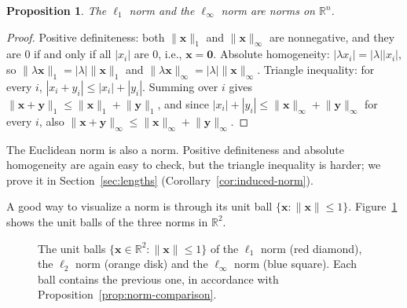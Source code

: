 \documentclass[11pt]{article}
\newcommand{\norm}[1]{\lVert #1 \rVert}
\theoremstyle{definition}
\theoremstyle{plain}
\newtheorem{proposition}[definition]{Proposition}
\theoremstyle{remark}
\begin{document}
\begin{proposition}\label{prop:l1-linf}
    The $\ell_1$ norm and the $\ell_\infty$ norm are norms on $\mathbb{R}^n$.
\end{proposition}

\begin{proof}
    Positive definiteness: both $\norm{\mathbf{x}}_1$ and $\norm{\mathbf{x}}_\infty$ are nonnegative, and they are $0$ if and only if all $|x_i|$ are $0$, i.e., $\mathbf{x} = \mathbf{0}$. Absolute homogeneity: $|\lambda x_i| = |\lambda| |x_i|$, so $\norm{\lambda \mathbf{x}}_1 = |\lambda| \norm{\mathbf{x}}_1$ and $\norm{\lambda \mathbf{x}}_\infty = |\lambda| \norm{\mathbf{x}}_\infty$. Triangle inequality: for every $i$, $|x_i + y_i| \leq |x_i| + |y_i|$. Summing over $i$ gives $\norm{\mathbf{x} + \mathbf{y}}_1 \leq \norm{\mathbf{x}}_1 + \norm{\mathbf{y}}_1$, and since $|x_i| + |y_i| \leq \norm{\mathbf{x}}_\infty + \norm{\mathbf{y}}_\infty$ for every $i$, also $\norm{\mathbf{x} + \mathbf{y}}_\infty \leq \norm{\mathbf{x}}_\infty + \norm{\mathbf{y}}_\infty$.
\end{proof}

The Euclidean norm is also a norm. Positive definiteness and absolute homogeneity are again easy to check, but the triangle inequality is harder; we prove it in Section~\ref{sec:lengths} (Corollary~\ref{cor:induced-norm}).

A good way to visualize a norm is through its unit ball $\{\mathbf{x} : \norm{\mathbf{x}} \leq 1\}$. Figure~\ref{fig:unit-balls} shows the unit balls of the three norms in $\mathbb{R}^2$.

\begin{figure}[ht]
    \centering
    \caption[Unit balls of the $\ell_1$, $\ell_2$ and $\ell_\infty$ norms]{The unit balls $\{\mathbf{x} \in \mathbb{R}^2 : \norm{\mathbf{x}} \leq 1\}$ of the $\ell_1$ norm (red diamond), the $\ell_2$ norm (orange disk) and the $\ell_\infty$ norm (blue square). Each ball contains the previous one, in accordance with Proposition~\ref{prop:norm-comparison}.}
    \label{fig:unit-balls}
\end{figure}
\end{document}
